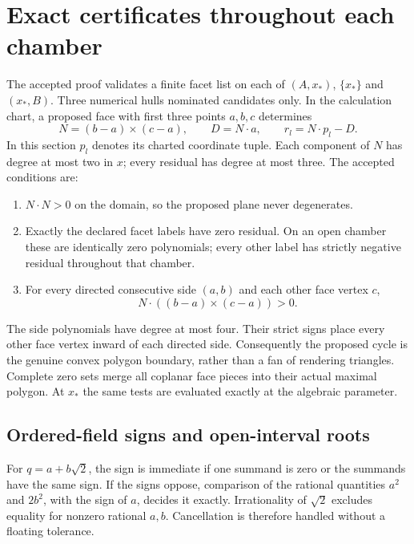 \documentclass[11pt,a4paper]{article}
\newcommand{\xs}{x_*}
\theoremstyle{definition}
\begin{document}
\section{Exact certificates throughout each chamber}\label{sec:certificates}
The accepted proof validates a finite facet list on each of $(A,\xs)$, $\{\xs\}$ and $(\xs,B)$. Three numerical hulls nominated candidates only. In the calculation chart, a proposed face with first three points $a,b,c$ determines
\begin{equation}\label{eq:face-plane}
N=(b-a)\times(c-a),\qquad D=N\cdot a,\qquad
r_l=N\cdot p_l-D.
\end{equation}
In this section $p_l$ denotes its charted coordinate tuple. Each component of $N$ has degree at most two in $x$; every residual has degree at most three. The accepted conditions are:
\begin{enumerate}
\item $N\cdot N>0$ on the domain, so the proposed plane never degenerates.
\item Exactly the declared facet labels have zero residual. On an open chamber these are identically zero polynomials; every other label has strictly negative residual throughout that chamber.
\item For every directed consecutive side $(a,b)$ and each other face vertex $c$,
\begin{equation}\label{eq:side-test}
N\cdot((b-a)\times(c-a))>0.
\end{equation}
\end{enumerate}
The side polynomials have degree at most four. Their strict signs place every other face vertex inward of each directed side. Consequently the proposed cycle is the genuine convex polygon boundary, rather than a fan of rendering triangles. Complete zero sets merge all coplanar face pieces into their actual maximal polygon. At $\xs$ the same tests are evaluated exactly at the algebraic parameter.

\subsection{Ordered-field signs and open-interval roots}\label{sec:sturm}
For $q=a+b\sqrt2$, the sign is immediate if one summand is zero or the summands have the same sign. If the signs oppose, comparison of the rational quantities $a^2$ and $2b^2$, with the sign of $a$, decides it exactly. Irrationality of $\sqrt2$ excludes equality for nonzero rational $a,b$. Cancellation is therefore handled without a floating tolerance.
\end{document}
